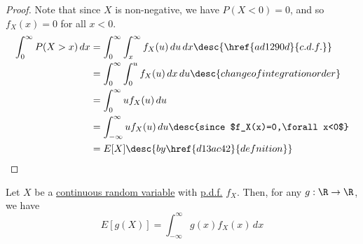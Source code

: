 \begin{proof}
  Note that since $X$ is non-negative, we have $P(X<0)=0$, and so $f_X(x)=0$ for
  all $x<0$.
  \begin{align*}
    \int_0^\infty P(X>x)\,dx
     &=\int_0^\infty\int_x^\infty f_X(u)\,du\,dx\desc{\href{ad1290d}{c.d.f.}} \\
     &=\int_0^\infty\int_0^uf_X(u)\,dx\,du\desc{change of integration order}  \\
     &=\int_0^\infty uf_X(u)\,du                                              \\
     &=\int_{-\infty}^\infty uf_X(u)\,du\desc{since $f_X(x)=0,\forall x<0$}   \\
     &=E[X]\desc{by \href{d13ac42}{defnition}}
  \end{align*}
\end{proof}

\label{b79a73c}

Let $X$ be a \href{bdb1e15}{continuous random variable} with
\href{cb9d3f0}{p.d.f.} $f_X$. Then, for any $g:\R\to\R$, we have
$$
  E[g(X)]=\int_{-\infty}^\infty g(x)f_X(x)\,dx
$$

